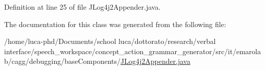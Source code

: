 Definition at line 25 of file J\-Log4j2\-Appender.\-java.



The documentation for this class was generated from the following file\-:\begin{DoxyCompactItemize}
\item 
/home/luca-\/phd/\-Documents/school luca/dottorato/research/verbal interface/speech\-\_\-workspace/concept\-\_\-action\-\_\-grammar\-\_\-generator/src/it/emarolab/cagg/debugging/base\-Components/\hyperlink{JLog4j2Appender_8java}{J\-Log4j2\-Appender.\-java}\end{DoxyCompactItemize}
